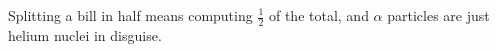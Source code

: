 \documentclass{article}
\begin{document}
Splitting a bill in half means computing $\frac{1}{2}$ of the total,
and $\alpha$ particles are just helium nuclei in disguise.
\end{document}
